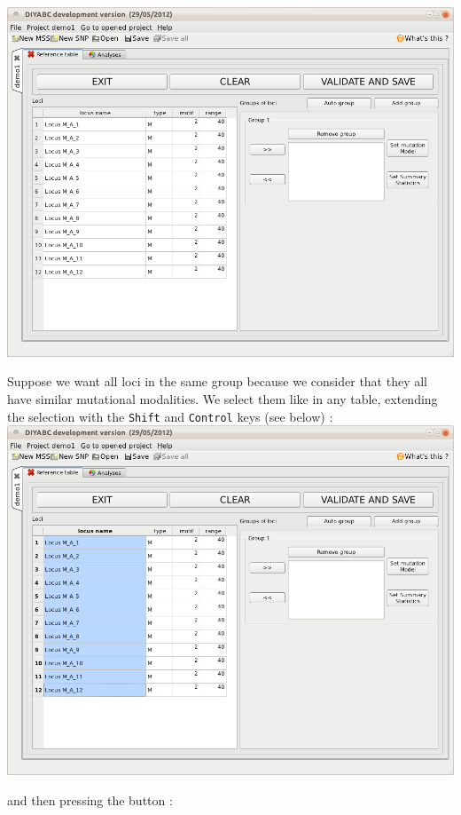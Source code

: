 \includegraphics[scale=0.35]{gui_pictures/Capture-DIYABC-16.png} 

Suppose we want all loci in the same group because we consider that they all have similar mutational modalities. We select them like in any table, extending the selection with the \texttt{Shift} and \texttt{Control} keys (see below) : \\

\includegraphics[scale=0.35]{gui_pictures/Capture-DIYABC-17.png} 

and then pressing the \fbox{\textsf{$ >> $}} button : \\

